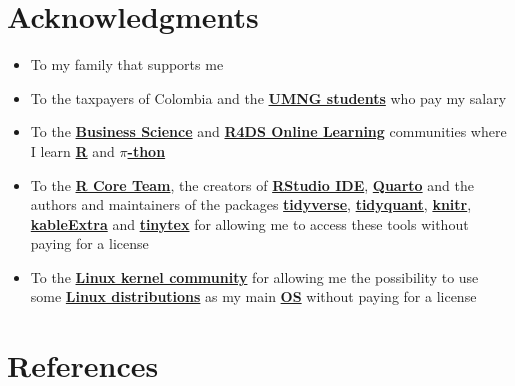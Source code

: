 \documentclass[
  ignorenonframetext,
]{beamer}
\begin{document}
\section{Acknowledgments}\label{acknowledgments}

\begin{frame}{}
\label{section-18}
\begin{itemize}
\item
  To my family that supports me
\item
  To the taxpayers of Colombia and the
  \href{https://www.umng.edu.co/estudiante}{\textbf{UMNG students}} who
  pay my salary
\item
  To the \href{https://www.business-science.io/}{\textbf{Business
  Science}} and \href{https://www.rfordatasci.com/}{\textbf{R4DS Online
  Learning}} communities where I learn
  \href{https://www.r-project.org/about.html}{\textbf{R}} and
  \href{https://www.python.org/about/}{\textbf{\(\pi\)-thon}}
\item
  To the \href{https://www.r-project.org/contributors.html}{\textbf{R
  Core Team}}, the creators of
  \href{https://rstudio.com/products/rstudio/}{\textbf{RStudio IDE}},
  \href{https://quarto.org/}{\textbf{Quarto}} and the authors and
  maintainers of the packages
  \href{https://CRAN.R-project.org/package=tidyverse}{\textbf{tidyverse}},
  \href{https://CRAN.R-project.org/package=tidyquant}{\textbf{tidyquant}},
  \href{https://CRAN.R-project.org/package=knitr}{\textbf{knitr}},
  \href{https://CRAN.R-project.org/package=kableExtra}{\textbf{kableExtra}}
  and
  \href{https://CRAN.R-project.org/package=tinytex}{\textbf{tinytex}}
  for allowing me to access these tools without paying for a license
\item
  To the \href{https://www.kernel.org/category/about.html}{\textbf{Linux
  kernel community}} for allowing me the possibility to use some
  \href{https://static.lwn.net/Distributions/}{\textbf{Linux
  distributions}} as my main
  \href{https://en.wikipedia.org/wiki/Operating_system}{\textbf{OS}}
  without paying for a license
\end{itemize}
\end{frame}

\section*{References}\label{references}
\end{document}
